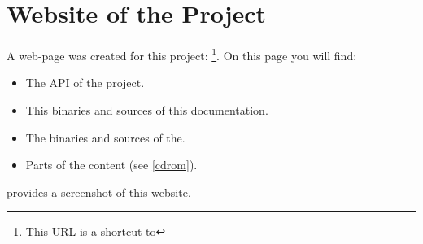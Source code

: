 \chapter{Website of the Project}\label{appendix_website}
A web-page was created for this project: \footnote{This URL is a shortcut to }. On this page you will find:
\begin{itemize}
\item The API of the project.
\item This binaries and sources of this documentation.
\item The binaries and sources of the.
\item Parts of the content (see \ref{cdrom}).
\end{itemize}
 provides a screenshot of this website.


